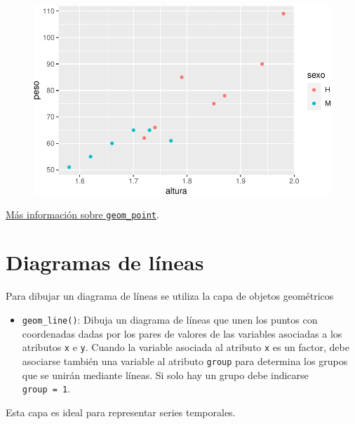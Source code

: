 \documentclass[
  a4paper,
]{scrreport}
\providecommand{\tightlist}{%
  \setlength{\itemsep}{0pt}\setlength{\parskip}{0pt}}\usepackage{longtable,booktabs,array}
\theoremstyle{definition}
\theoremstyle{definition}
\theoremstyle{remark}
\begin{document}
\begin{figure}[H]

{\centering \includegraphics{07-graficos_files/figure-pdf/unnamed-chunk-5-1.pdf}

}

\end{figure}

\href{https://ggplot2.tidyverse.org/reference/geom_point.html}{Más
información sobre \texttt{geom\_point}}.

\hypertarget{diagramas-de-luxedneas}{%
\section{Diagramas de líneas}\label{diagramas-de-luxedneas}}

Para dibujar un diagrama de líneas se utiliza la capa de objetos
geométricos

\begin{itemize}
\tightlist
\item
  \texttt{geom\_line()}: Dibuja un diagrama de líneas que unen los
  puntos con coordenadas dadas por los pares de valores de las variables
  asociadas a los atributos \texttt{x} e \texttt{y}. Cuando la variable
  asociada al atributo \texttt{x} es un factor, debe asociarse también
  una variable al atributo \texttt{group} para determina los grupos que
  se unirán mediante líneas. Si solo hay un grupo debe indicarse
  \texttt{group\ =\ 1}.
\end{itemize}

Esta capa es ideal para representar series temporales.
\end{document}
